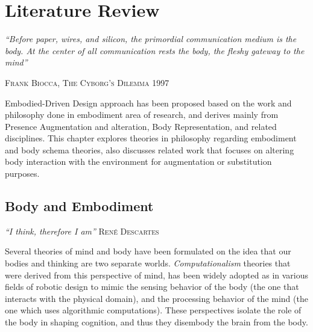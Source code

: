 		
\chapter{Literature Review}
\label{ch:related}


\begin{flushright}
\textit{
``Before paper, wires, and silicon, the primordial communication medium is the body. At the
center of all communication rests the body, the fleshy gateway to the mind''}
\par\hfill\textsc{Frank Biocca, The Cyborg's Dilemma 1997}


\end{flushright}
\vspace{15pt}

Embodied-Driven Design approach has been proposed based on the work and philosophy done in embodiment area of research, and derives mainly from Presence Augmentation and alteration, Body Representation, and related disciplines. This chapter explores theories in philosophy regarding embodiment and body schema theories, also discusses related work that focuses on altering body interaction with the environment for augmentation or substitution purposes.


\section{Body and Embodiment}

\begin{flushleft}
\textit{
``I think, therefore I am''  }\textsc{René Descartes}
\end{flushleft}

Several theories of mind and body have been formulated on the idea that our bodies and thinking are two separate worlds. \textit{Computationalism} theories that were derived from this perspective of mind, has been widely adopted as in various fields of robotic design to mimic the sensing behavior of the body (the one that interacts with the physical domain), and the processing behavior of the mind (the one which uses algorithmic computations). These perspectives isolate the role of the body in shaping cognition, and thus they disembody the brain from the body. 


